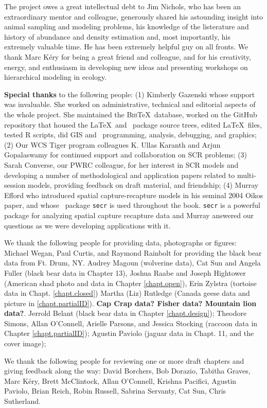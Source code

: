 
The project owes a great intellectual debt to Jim Nichols, who has
been an extraordinary mentor and colleague, generously shared his
astounding insight into animal sampling and modeling problems, his
knowledge
of the listerature and history of abundance and density estimation
and, most importantly, his extremely valuable time. 
He has 
been extremely helpful guy on all fronts.  We thank Marc K\'{e}ry
for being a great friend and colleague, and for his creativity, %
energy, and enthusiasm in developing new ideas and
presenting workshops on hierarchical modeling in ecology.

{\bf Special thanks} to the following people: (1) Kimberly Gazenski whose support was
invaluable. She worked on administrative, technical and editorial
aspects of the whole project. She maintained the \textsc{Bib}\TeX~database,
worked on the GitHub repository that housed the \LaTeX~and \R~package
source trees, edited \LaTeX~files, tested R scripts, did GIS and
\R~programming, analysis, debugging, and graphics;  (2) Our WCS Tiger
program colleagues K. Ullas Karanth and Arjun Gopalaswamy for
continued support and collaboration on SCR problems;  (3) Sarah
Converse, our PWRC colleague, for her interest in SCR models and
developing a number of methodological and application papers related
to multi-session models, providing feedback on draft material, and
friendship;  (4) Murray Efford who introduced spatial
capture-recapture models %
in his seminal 2004 Oikos paper, and whose \R~package \mbox{\tt secr} is used
throughout the book.  \mbox{\tt secr} is a powerful package for analyzing
spatial capture recapture data and Murray answered our questions as we
were developing applications with it.


We thank the following people for providing data, photographs or figures:
Michael Wegan, Paul Curtis, and Raymond Rainbolt for providing the black bear data from Ft. Drum, NY.
Audrey Magoun (wolverine data), Cat Sun and Angela Fuller (black bear
data in Chapter 13), Joshua Raabe and Joseph Hightower (American shad
photo and data in Chapter \ref{chapt.open}), Erin Zylstra (tortoise
data in Chapt. \ref{chapt.closed}) Martha (Liz) Rutledge (Canada geese
data and picture in \ref{chapt.partialID}).  {\bf Cap Crap data?
  Fisher data?  Mountain lion data?}.  Jerrold Belant (black bear data
in Chapter \ref{chapt.design}); Theodore Simons, Allan O'Connell,
Arielle Parsons, and Jessica Stocking (raccoon data in Chapter
\ref{chapt.partialID}); Agustin Paviolo (jaguar data in Chapt. 11, and
the cover image);

We thank the following people for reviewing one or more draft chapters
and giving feedback along the way:
David Borchers,
Bob Dorazio,
Tabitha Graves,
Marc K\'{e}ry,
Brett McClintock,
Allan O'Connell,
Krishna Pacifici,
Agustin Paviolo,
Brian Reich,
Robin Russell,
Sabrina Servanty,
Cat Sun,
Chris Sutherland.


